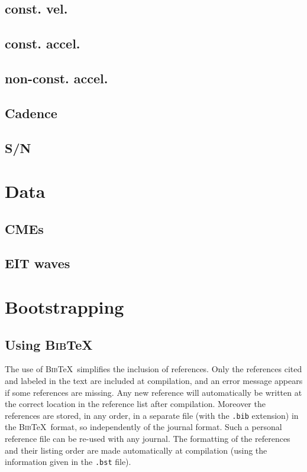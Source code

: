 \documentclass[namedreferences]{SolarPhysics}
\newcommand{\BibTeX}{\textsc{Bib}\TeX}
\begin{document}
\begin{article}
 \subsection{const. vel.}

\subsection{const. accel.}

\subsection{non-const. accel.}

\subsection{ Cadence}

\subsection{S/N}

\section{Data}

\subsection{CMEs}

\subsection{EIT waves}

\section{Bootstrapping}

      
\subsection{Using \BibTeX} %
  \label{S-BibTeX}
  The use of \BibTeX\ simplifies the inclusion of references. Only the 
references cited and labeled in the text are included at compilation, 
and an error message appears if some references
are missing.  Any new reference will automatically be written at the correct 
location in the reference list after compilation. 
Moreover the references are stored, in any order, in a separate file
(with the \texttt{.bib} extension) in the \BibTeX\ format, so independently of 
the journal format. Such a personal reference file can be re-used with any journal.
The formatting of the references and their listing order are made automatically
at compilation (using the information given in the \texttt{.bst} file). 
        

\end{article}
\end{document}

